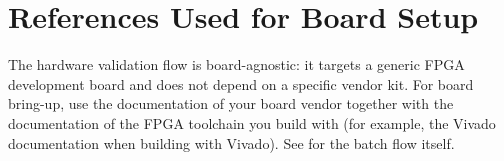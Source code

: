 \documentclass[11pt]{article}
\begin{document}
\section{References Used for Board Setup}
\begingroup
\small
The hardware validation flow is board-agnostic: it targets a generic FPGA
development board and does not depend on a specific vendor kit. For board
bring-up, use the documentation of your board vendor together with the
documentation of the FPGA toolchain you build with (for example, the Vivado
documentation when building with Vivado). See
 for the batch flow itself.
\endgroup
\end{document}
